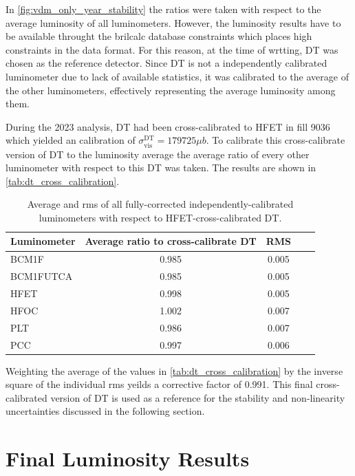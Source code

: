 In \autoref{fig:vdm_only_year_stability} the ratios were taken with respect to the average luminosity of all luminometers. However, the luminosity results have to be available throught the brilcalc database constraints which places high constraints in the data format. For this reason, at the time of wrtting, DT was chosen as the reference detector. Since DT is not a independently calibrated luminometer due to lack of available statistics, it was calibrated to the average of the other luminometers, effectively representing the average luminosity among them.

During the 2023 analysis, DT had been cross-calibrated to HFET in fill 9036 which yielded an calibration of $\sigma^{\text{DT}}_{\mathrm{vis}} = 179725 \mu b$. To calibrate this cross-calibrate version of DT to the luminosity average the average ratio of every other luminometer with respect to this DT was taken. The results are shown in \autoref{tab:dt_cross_calibration}.

\begin{table}[!htb]
	\caption{Average and rms of all fully-corrected independently-calibrated luminometers with respect to HFET-cross-calibrated DT.}
	
	\label{tab:dt_cross_calibration}
	\centering
	\begin{tabular}{lcccc}
		\hline
		Luminometer & Average ratio to cross-calibrate DT & RMS \\
		\hline
		BCM1F     & 0.985 & 0.005 \\
		BCM1FUTCA & 0.985 & 0.005 \\
		HFET      & 0.998 & 0.005 \\
		HFOC      & 1.002 & 0.007 \\
		PLT       & 0.986 & 0.007 \\
		PCC       & 0.997 & 0.006 \\
		\hline
	\end{tabular}
\end{table}

Weighting the average of the values in \autoref{tab:dt_cross_calibration} by the inverse square of the individual rms yeilds a corrective factor of 0.991. This final cross-calibrated version of DT is used as a reference for the stability and non-linearity uncertainties discussed in the following section.

\section{Final Luminosity Results}

